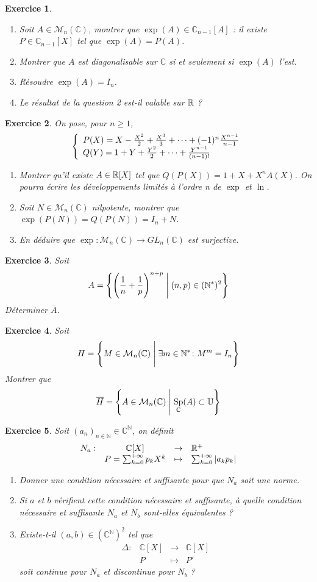 \documentclass[12pt]{article}
\newtheorem{exercise}{Exercice}[section]
\theoremstyle{remark}
\theoremstyle{remark}
\newcommand{\C}{\mathbb{C}} \newcommand{\Q}{\mathbb{Q}}
\newcommand{\N}{\mathbb{N}} \newcommand{\Z}{\mathbb{Z}}
\newcommand{\U}{\mathbb{U}} \newcommand{\E}{\mathbb{E}}
\newcommand{\M}{\mathcal{M}} \renewcommand{\L}{\mathcal{L}}
\DeclareMathOperator{\Sp}{Sp} \DeclareMathOperator{\mat}{mat}
\newcommand{\function}[5]{
	$$
	\begin{array}{rccl}
		#1: & #2 & \to & #3 \\
		& #4 & \mapsto & #5
	\end{array}
	$$
}
\begin{document}
\begin{exercise}
	\phantom{}
	\begin{enumerate}
		\item Soit $A\in\M_{n}(\C)$, montrer que $\exp(A)\in\C_{n-1}[A]$ : il existe $P\in\C_{n-1}[X]$ tel que $\exp(A)=P(A)$.
		\item Montrer que $A$ est diagonalisable sur $\C$ si et seulement si $\exp(A)$ l'est.
		\item Résoudre $\exp(A)=I_{n}$.
		\item Le résultat de la question 2 est-il valable sur $\mathbb{R}$ ?
	\end{enumerate}
\end{exercise}

\begin{exercise}
	On pose, pour $n\geqslant1$,
	$$
	\left\{
		\begin{array}[]{l}
			P(X)=X-\frac{X^{2}}{2}+\frac{X^{3}}{3}+\dots+(-1)^{n}\frac{X^{n-1}}{n-1}\\
			Q(Y)=1+Y+\frac{Y^{2}}{2}+\dots+\frac{Y^{n-1}}{(n-1)!}
		\end{array}
	\right.
	$$
	\begin{enumerate}
		\item Montrer qu'il existe $A\in\mathbb{R}[X]$ tel que $Q(P(X))=1+X+X^{n}A(X)$. On pourra écrire les développements limités à l'ordre n de $\exp$ et $\ln$.
		\item Soit $N\in\M_{n}(\C)$ nilpotente, montrer que $\exp(P(N))=Q(P(N))=I_{n}+N$.
		\item En déduire que $\exp\colon\M_{n}(\C)\to GL_{n}(\C)$ est surjective.
	\end{enumerate}
\end{exercise}

\begin{exercise}
	Soit 
	$$A=\Biggl\{\Biggl(\frac{1}{n}+\frac{1}{p}\Biggr)^{n+p}\Biggm|(n,p)\in(\N^{*})^{2}\Biggr\}$$
	Déterminer $\overline{A}$.
\end{exercise}

\begin{exercise}
	Soit 
	$$H=\Biggl\{M\in\M_{n}(\C)\Biggm|\exists m\in\N^{*}\colon M^{m}=I_{n}\Biggr\}$$
	Montrer que 
	$$\overline{H}=\Biggl\{A\in\M_{n}(\C)\Biggm|\Sp_{\C}(A)\subset\U\Biggr\}$$
\end{exercise}

\begin{exercise}
	Soit $(a_{n})_{n\in\N}\in\C^{\N}$, on définit \function{N_{a}}{\C[X]}{\R^{+}}{P=\sum_{k=0}^{+\infty}p_{k}X^{k}}{\sum_{k=0}^{+\infty}\vert a_{k}p_{k}\vert}
	\begin{enumerate}
		\item Donner une condition nécessaire et suffisante pour que $N_{a}$ soit une norme.
		\item Si $a$ et $b$ vérifient cette condition nécessaire et suffisante, à quelle condition nécessaire et suffisante $N_{a}$ et $N_{b}$ sont-elles équivalentes ?
		\item Existe-t-il $(a,b)\in(\C^{\N})^{2}$ tel que \function{\Delta}{\C[X]}{\C[X]}{P}{P'} soit continue pour $N_{a}$ et discontinue pour $N_{b}$ ?
	\end{enumerate}
\end{exercise}
\end{document}
